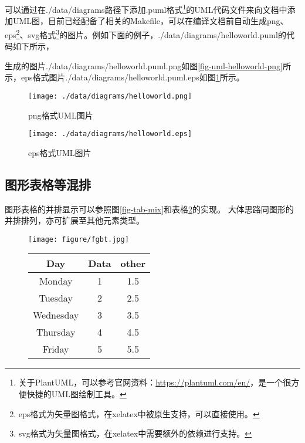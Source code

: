 可以通过在./data/diagrams路径下添加.puml格式\footnote{关于PlantUML，可以参考官网资料：\url{https://plantuml.com/en/}，是一个很方便快捷的UML图绘制工具。}的UML代码文件来向文档中添加UML图，目前已经配备了相关的Makefile，可以在编译文档前自动生成png、eps\footnote{eps格式为矢量图格式，在xelatex中被原生支持，可以直接使用。}、svg格式\footnote{svg格式为矢量图格式，在xelatex中需要额外的依赖进行支持。}的图片。例如下面的例子，./data/diagrams/helloworld.puml的代码如下所示，

生成的图片./data/diagrams/helloworld.puml.png如图\ref{fig-uml-helloworld-png}所示，eps格式图片./data/diagrams/helloworld.puml.eps如图\ref{fig-uml-helloworld-eps}所示。
\begin{figure}[h!]
	\begin{minipage}{0.48\textwidth}
		\centering
		\texttt{[image: ./data/diagrams/helloworld.png]}
		\caption{png格式UML图片}
		\label{fig-uml-helloworld-png}
	\end{minipage}
	\begin{minipage}{0.48\textwidth}
		\centering
		\texttt{[image: ./data/diagrams/helloworld.eps]}
		\caption{eps格式UML图片}
		\label{fig-uml-helloworld-eps}
	\end{minipage}
\end{figure}


\subsection{图形表格等混排}
\label{subsec-morefigtab}
图形表格的并排显示可以参照图\ref{fig-tab-mix}和表格\ref{tab-fig-mix}的实现。
大体思路同图形的并排排列，亦可扩展至其他元素类型。
\begin{figure}[h!]
    \begin{minipage}{0.5\textwidth}
        \centering
        \texttt{[image: figure/fgbt.jpg]}
        \label{fig-tab-mix}
    \end{minipage}
    \begin{minipage}{0.5\textwidth}
        \centering
        \begin{tabular}{c||c|c} \hline
            Day       & Data & other \\ \hline \hline
            Monday    & 1    & 1.5   \\
            Tuesday   & 2    & 2.5   \\
            Wednesday & 3    & 3.5   \\
            Thursday  & 4    & 4.5   \\
            Friday    & 5    & 5.5   \\ \hline
        \end{tabular}
        \label{tab-fig-mix}
    \end{minipage}
\end{figure}

